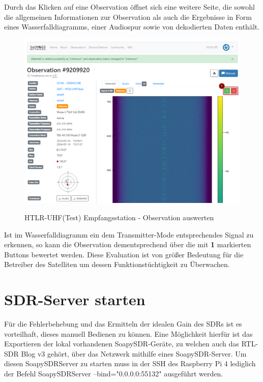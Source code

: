 Durch das Klicken auf eine Observation öffnet sich eine weitere Seite, die sowohl die allgemeinen Informationen zur Observation als auch die Ergebnisse in Form eines Wasserfalldiagramms, einer Audiospur sowie von dekodierten Daten enthält. 

\begin{figure} [H]
	\centering
	\includegraphics[width=\linewidth]{../ref/vet_observation.png}
	\caption{HTLR-UHF(Test) Empfangsstation - Observation auswerten} \cite{noauthor_satnogs_nodate}
	\label{fig:htrl-uhf(test)vetobservation}
\end{figure}

Ist im Wasserfalldiagramm ein dem Transmitter-Mode entsprechendes Signal zu erkennen, so kann die Observation dementsprechend über die mit \textbf{1} markierten Buttons bewertet werden. Diese Evaluation ist von größer Bedeutung für die Betreiber des Satelliten um dessen Funktionstüchtigkeit zu Überwachen.

\section{SDR-Server starten}
Für die Fehlerbehebung und das Ermitteln der idealen Gain des SDRs ist es vorteilhaft, dieses manuell Bedienen zu können. Eine Möglichkeit hierfür ist das Exportieren der lokal vorhandenen SoapySDR-Geräte, zu welchen auch das RTL-SDR Blog v3 gehört, über das Netzwerk mithilfe eines SoapySDR-Server. Um diesen SoapySDRServer zu starten muss in der SSH des Raspberry Pi 4 lediglich der Befehl \glqq SoapySDRServer --bind="0.0.0.0:55132"\grqq{} ausgeführt werden. \cite{noauthor_soapysdrserver1_nodate}

